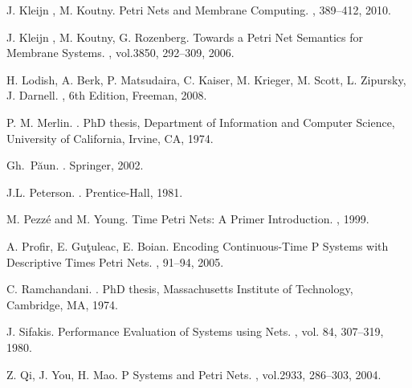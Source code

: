 \documentclass{eptcs}
\begin{document}
\begin{thebibliography}{1}
J. Kleijn , M. Koutny.
\newblock Petri Nets and Membrane Computing.
, 389--412,
2010.

J. Kleijn , M. Koutny, G. Rozenberg.
\newblock Towards a Petri Net Semantics for Membrane Systems.
, vol.3850,
292--309, 2006.
\newblock {}

H. Lodish, A. Berk, P. Matsudaira, C. Kaiser, M. Krieger, M. Scott,
L. Zipursky, J. Darnell.
, 6th Edition, Freeman, 2008.

P. M. Merlin.
.
\newblock PhD thesis, Department of Information and Computer Science,
University of California, Irvine, CA, 1974.

Gh.~P\u aun.
.
\newblock Springer, 2002.
\newblock {}

J.L. Peterson.
.
\newblock Prentice-Hall, 1981.

M. Pezz\'e and M. Young.
\newblock Time Petri Nets: A Primer Introduction.
, 1999.

A. Profir, E. Gu\c tuleac, E. Boian.
\newblock Encoding Continuous-Time P Systems with Descriptive Times Petri
Nets.
, 91--94, 2005.

C. Ramchandani.
.
\newblock PhD thesis, Massachusetts Institute of Technology, Cambridge, MA,
1974.

J. Sifakis.
\newblock Performance Evaluation of Systems using Nets.
, vol. 84, 307--319, 1980.
\newblock {}

Z. Qi, J. You, H. Mao.
\newblock P Systems and Petri Nets.
, vol.2933,
286--303, 2004.
\newblock {}

\end{thebibliography}
\end{document}
